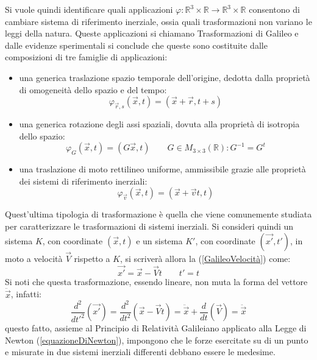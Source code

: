 Si vuole quindi identificare quali applicazioni $\varphi:\mathbb{R}^3\times\mathbb{R}\rightarrow
\mathbb{R}^3\times\mathbb{R}$ consentono di cambiare sistema di riferimento inerziale, ossia quali 
trasformazioni non variano le leggi della natura. Queste applicazioni si chiamano Trasformazioni di 
Galileo e dalle evidenze sperimentali si conclude che queste sono costituite dalle 
composizioni di tre famiglie di applicazioni:
\begin{itemize}
	\item una generica traslazione spazio temporale dell'origine, dedotta dalla proprietà 
	di omogeneità dello spazio e del tempo:
	\begin{equation}
		\varphi_{\vec{r},s}(\vec{x},t)=(\vec{x}+\vec{r},t+s)
		\label{GalileoTraslazoine}
	\end{equation} 
\item una generica rotazione degli assi spaziali, dovuta alla proprietà di isotropia dello spazio:
\begin{equation}
	\varphi_{G}(\vec{x},t)=(G\vec{x},t) \qquad G\in M_{3\times3}(\mathbb{R}):G^{-1}=G^t
	\label{GalileoRotazione}
\end{equation} 
	\item una traslazione di moto rettilineo uniforme, ammissibile grazie alle proprietà dei sistemi 
	di riferimento inerziali:
\begin{equation}
	\varphi_{\vec{v}}(\vec{x},t)=(\vec{x}+\vec{v}t,t)
	\label{GalileoVelocità}
\end{equation} 
\end{itemize}
Quest'ultima tipologia di trasformazione è quella che viene comunemente studiata per caratterizzare le trasformazioni di sistemi inerziali. 
Si consideri quindi un sistema $K$, con coordinate $(\vec{x},t)$ e un sistema $K'$, con 
coordinate $(\vec{x'},t')$, in moto a velocità $\vec{V}$ rispetto a $K$, si scriverà allora la 
(\ref{GalileoVelocità}) come:
\begin{equation}
	\vec{x'}=\vec{x}-\vec{V}t \qquad t'=t
	\label{GalileoEasy}
\end{equation}
Si noti che questa trasformazione, essendo lineare, non muta la forma del vettore $\ddot{\vec{x}}$, infatti:
\begin{equation*}
	\frac{d^2}{dt'^2}(\vec{x'})=\frac{d^2}{dt^2}(\vec{x}-\vec{V}t)=\ddot{\vec{x}}+\frac{d}{dt}(\vec{V})=\ddot{\vec{x}}
\end{equation*} 
questo fatto, assieme al Principio di Relatività Galileiano applicato alla Legge di Newton (\ref{equazioneDiNewton}), 
impongono che le forze esercitate su di un punto e misurate in due sistemi inerziali differenti debbano essere le medesime. \\

